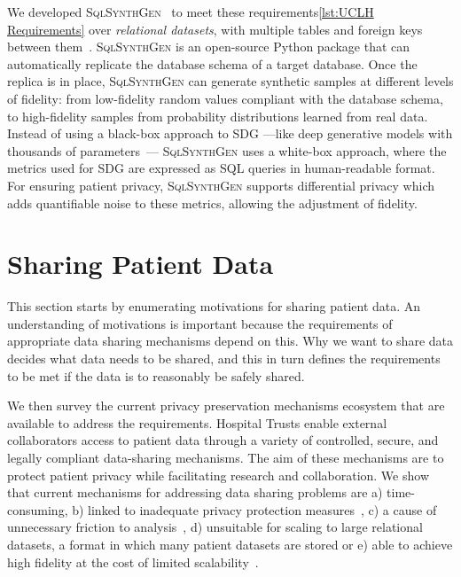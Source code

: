 \documentclass[11pt]{article}
\begin{document}
We developed \textsc{SqlSynthGen}~\cite{repository} to meet these requirements\ref{lst:UCLH Requirements} over \emph{relational datasets}, with multiple tables and foreign keys between them~\cite{Cai2023}.
\textsc{SqlSynthGen} is an open-source Python package that can automatically replicate the database schema of a target database.
Once the replica is in place, \textsc{SqlSynthGen} can generate synthetic samples at different levels of fidelity: from low-fidelity random values compliant with the database schema, to high-fidelity samples from probability distributions learned from real data.
Instead of using a black-box approach to SDG ---like deep generative models with thousands of parameters~\cite{DBLP:journals/pami/Bond-TaylorLLW22}--- \textsc{SqlSynthGen} uses a white-box approach, where the metrics used for SDG are expressed as SQL queries in human-readable format.
For ensuring patient privacy, \textsc{SqlSynthGen} supports differential privacy which adds quantifiable noise to these metrics, allowing the adjustment of fidelity.

\section{Sharing Patient Data}

This section starts by enumerating motivations for sharing patient data. An understanding of motivations is important because the requirements of appropriate data sharing mechanisms depend on this. Why we want to share data decides what data needs to be shared, and this in turn defines the requirements to be met if the data is to reasonably be safely shared.

We then survey the current privacy preservation mechanisms ecosystem that are available to address the requirements. Hospital Trusts enable external collaborators access to patient data through a variety of controlled, secure, and legally compliant data-sharing mechanisms. The aim of these mechanisms are to protect patient privacy while facilitating research and collaboration. We show that current mechanisms for addressing data sharing problems  are  a) time-consuming, b) linked to inadequate privacy protection measures~\cite{near2021, tucker2020}, c) a cause of unnecessary friction to analysis~\cite{ODonovan2023}, d) unsuitable for scaling to large relational datasets, a format in which many patient datasets are stored or e) able to achieve high fidelity at the cost of limited scalability~\cite{Cai2023}.
\end{document}
